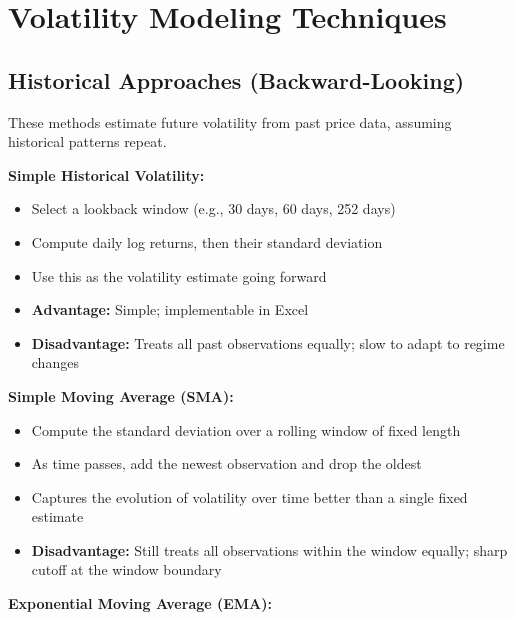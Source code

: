 \documentclass[12pt,openany]{book}
\theoremstyle{definition}
\theoremstyle{remark}
\begin{document}
\section{Volatility Modeling Techniques}
\subsection{Historical Approaches (Backward-Looking)}
These methods estimate future volatility from past price data, assuming historical patterns repeat.

\textbf{Simple Historical Volatility:}

\begin{itemize}
\item Select a lookback window (e.g., 30 days, 60 days, 252 days)


\item Compute daily log returns, then their standard deviation


\item Use this as the volatility estimate going forward


\item \textbf{Advantage:} Simple; implementable in Excel


\item \textbf{Disadvantage:} Treats all past observations equally; slow to adapt to regime changes


\end{itemize}
\textbf{Simple Moving Average (SMA):}

\begin{itemize}
\item Compute the standard deviation over a rolling window of fixed length


\item As time passes, add the newest observation and drop the oldest


\item Captures the evolution of volatility over time better than a single fixed estimate


\item \textbf{Disadvantage:} Still treats all observations within the window equally; sharp cutoff at the window boundary


\end{itemize}
\textbf{Exponential Moving Average (EMA):}
\end{document}
